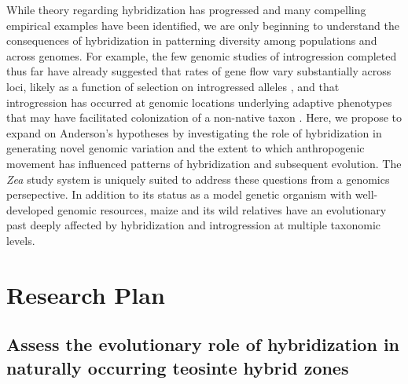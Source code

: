 While theory regarding hybridization has progressed and many compelling empirical examples have been identified, we are only beginning to understand the consequences of hybridization in patterning diversity among populations and across genomes. 
For example, the few genomic studies of introgression completed thus far have already suggested that rates of gene flow vary substantially across loci, likely as a function of selection on introgressed alleles \citep{Hufford2013, Poelstra2014}, and that introgression has occurred at genomic locations underlying adaptive phenotypes that may have facilitated colonization of a non-native taxon \citep{Hufford2013}.
Here, we propose to expand on Anderson's \citeyearpar{Anderson1954} hypotheses by investigating the role of hybridization in generating novel genomic variation and the extent to which anthropogenic movement has influenced patterns of hybridization and subsequent evolution.
The \emph{Zea} study system is uniquely suited to address  these questions from a genomics persepective.  
In addition to its status as a model genetic organism with well-developed genomic resources, maize and its wild relatives have an evolutionary past deeply affected by hybridization and introgression at multiple taxonomic levels.


\section*{Research Plan}
\subsection{Assess the evolutionary role of hybridization in naturally occurring teosinte hybrid zones}
\label{ss:hybrids}

